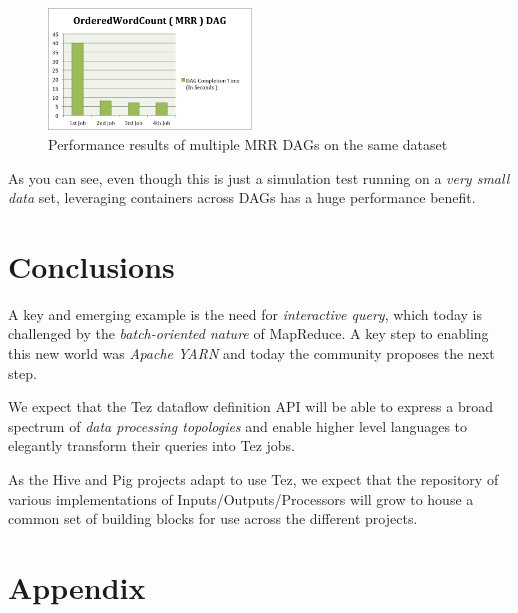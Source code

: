 \documentclass[twocolumn]{article}
\begin{document}
\begin{figure}[htb]
        \centering
        \includegraphics[width=0.48\textwidth]{sessions-tez2}
        \caption{Performance results of multiple MRR DAGs on the same dataset}
        \label{fig18}
\end{figure}

As you can see, even though this is just a simulation test running on a
\emph{very small data} set, leveraging containers across DAGs has a huge
performance benefit.

\section{Conclusions}

A key and emerging example is the need for \emph{interactive query}, which today is challenged by the \emph{batch-oriented nature} of MapReduce. 
A key step to enabling this new world was \emph{Apache YARN} and today the community proposes the next step.

We expect that the Tez dataflow definition API will be able to express a
broad spectrum of \emph{data processing topologies} and enable higher
level languages to elegantly transform their queries into Tez jobs.

As the Hive and Pig projects adapt to use Tez, we expect that the repository of various implementations of Inputs/Outputs/Processors will grow to house a common set of building blocks for use across the different projects.





\section*{Appendix}



\end{document}
